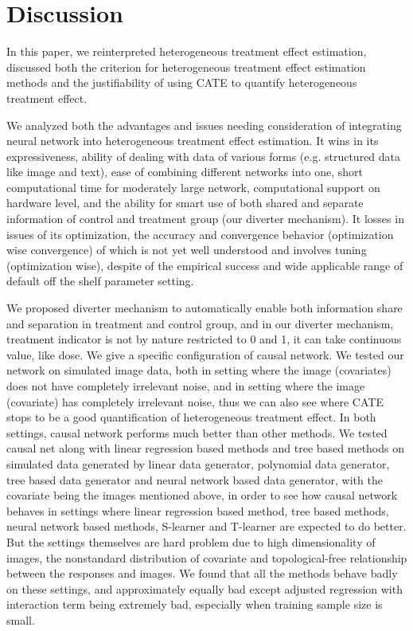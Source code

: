 \documentclass[11pt,paper=letter]{scrartcl}
\begin{document}
\section{Discussion}

In this paper, we reinterpreted heterogeneous treatment effect estimation, discussed both the criterion for heterogeneous treatment effect estimation methods and the justifiability of using CATE to quantify heterogeneous treatment effect. 

We analyzed both the advantages and issues needing consideration of integrating neural network into heterogeneous treatment effect estimation. It wins in its expressiveness, ability of dealing with data of various forms (e.g. structured data like image and text), ease of combining different networks into one, short computational time for moderately large network, computational support on hardware level, and the ability for smart use of both shared and separate information of control and treatment group (our diverter mechanism). It losses in issues of its optimization, the accuracy and convergence behavior (optimization wise convergence) of which is not yet well understood and involves tuning (optimization wise), despite of the empirical success and wide applicable range of default off the shelf parameter setting.

We proposed diverter mechanism to automatically enable both information share and separation in treatment and control group, and in our diverter mechanism, treatment indicator is not by nature restricted to 0 and 1, it can take continuous value, like dose. We give a specific configuration of causal network. We tested our network on simulated image data, both in setting where the image (covariates) does not have completely irrelevant noise, and in setting where the image (covariate) has completely irrelevant noise, thus we can also see where CATE stops to be a good quantification of heterogeneous treatment effect. In both settings, causal network performs much better than other methods. We tested causal net along with linear regression based methods and tree based methods on simulated data generated by linear data generator, polynomial data generator, tree based data generator and neural network based data generator, with the covariate being the images mentioned above, in order to see how causal network behaves in settings where linear regression based method, tree based methods, neural network based methods, S-learner and T-learner are expected to do better. But the settings themselves are hard problem due to high dimensionality of images, the nonstandard distribution of covariate and topological-free relationship between the responses and images. We found that all the methods behave badly on these settings, and approximately equally bad except adjusted regression with interaction term being extremely bad, especially when training sample size is small.
\end{document}
